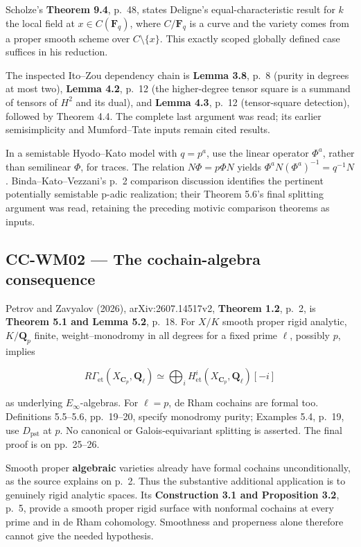 Scholze's \textbf{Theorem 9.4}, p.~48, states Deligne's
equal-characteristic result for \(k\) the local field at
\(x\in C(\mathbf F_q)\), where \(C/\mathbf F_q\) is a curve and the
variety comes from a proper smooth scheme over \(C\setminus\{x\}\). This
exactly scoped globally defined case suffices in his reduction.

The inspected Ito--Zou dependency chain is \textbf{Lemma 3.8}, p.~8
(purity in degrees at most two), \textbf{Lemma 4.2}, p.~12 (the
higher-degree tensor square is a summand of tensors of \(H^2\) and its
dual), and \textbf{Lemma 4.3}, p.~12 (tensor-square detection), followed
by Theorem 4.4. The complete last argument was read; its earlier
semisimplicity and Mumford--Tate inputs remain cited results.

In a semistable Hyodo--Kato model with \(q=p^a\), use the linear
operator \(\Phi^a\), rather than semilinear \(\Phi\), for traces. The
relation \(N\Phi=p\Phi N\) yields \(\Phi^aN(\Phi^a)^{-1}=q^{-1}N\).
Binda--Kato--Vezzani's p.~2 comparison discussion identifies the
pertinent potentially semistable p-adic realization; their Theorem 5.6's
final splitting argument was read, retaining the preceding motivic
comparison theorems as inputs.

\subsection{CC-WM02 --- The cochain-algebra
consequence}\label{cc-wm02-the-cochain-algebra-consequence}

Petrov and Zavyalov (2026), arXiv:2607.14517v2, \textbf{Theorem 1.2},
p.~2, is \textbf{Theorem 5.1 and Lemma 5.2}, p.~18. For \(X/K\) smooth
proper rigid analytic, \(K/\mathbf Q_p\) finite, weight--monodromy in
all degrees for a fixed prime \(\ell\), possibly \(p\), implies

\[
 R\Gamma_{\mathrm{et}}(X_{\mathbf C_p},\mathbf Q_\ell)
 \simeq \bigoplus_i H^i_{\mathrm{et}}(X_{\mathbf C_p},\mathbf Q_\ell)[-i]
\]

as underlying \(E_\infty\)-algebras. For \(\ell=p\), de Rham cochains
are formal too. Definitions 5.5--5.6, pp.~19--20, specify monodromy
purity; Examples 5.4, p.~19, use \(D_{\mathrm{pst}}\) at \(p\). No
canonical or Galois-equivariant splitting is asserted. The final proof
is on pp.~25--26.

Smooth proper \textbf{algebraic} varieties already have formal cochains
unconditionally, as the source explains on p.~2. Thus the substantive
additional application is to genuinely rigid analytic spaces. Its
\textbf{Construction 3.1 and Proposition 3.2}, p.~5, provide a smooth
proper rigid surface with nonformal cochains at every prime and in de
Rham cohomology. Smoothness and properness alone therefore cannot give
the needed hypothesis.

